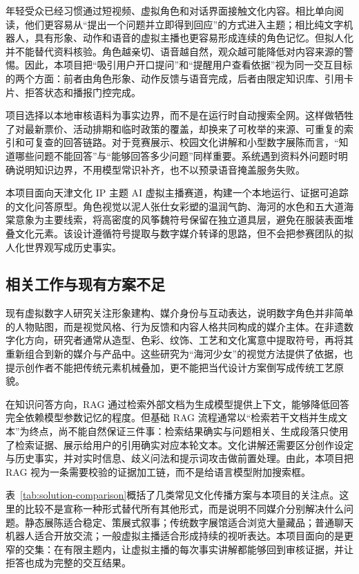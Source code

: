\documentclass[UTF8,zihao=-4,fontset=none,twoside]{ctexart}
\begin{document}
年轻受众已经习惯通过短视频、虚拟角色和对话界面接触文化内容。相比单向阅读，他们更容易从“提出一个问题并立即得到回应”的方式进入主题；相比纯文字机器人，具有形象、动作和语音的虚拟主播也更容易形成连续的角色记忆。但拟人化并不能替代资料核验。角色越亲切、语音越自然，观众越可能降低对内容来源的警惕。因此，本项目把“吸引用户开口提问”和“提醒用户查看依据”视为同一交互目标的两个方面：前者由角色形象、动作反馈与语音完成，后者由限定知识库、引用卡片、拒答状态和播报门控完成。

项目选择以本地审核语料为事实边界，而不是在运行时自动搜索全网。这样做牺牲了对最新票价、活动排期和临时政策的覆盖，却换来了可枚举的来源、可重复的索引和可复查的回答链路。对于竞赛展示、校园文化讲解和小型数字展陈而言，“知道哪些问题不能回答”与“能够回答多少问题”同样重要。系统遇到资料外问题时明确说明知识边界，不用模型常识补齐，也不以预录语音掩盖服务失败。

本项目面向天津文化 IP 主题 AI 虚拟主播赛道，构建一个本地运行、证据可追踪的文化问答原型。角色视觉以泥人张仕女彩塑的温润气韵、海河的水色和五大道海棠意象为主要线索，将高密度的风筝魏符号保留在独立道具层，避免在服装表面堆叠文化元素。该设计遵循符号提取与数字媒介转译的思路\cite{yuan2026symbol,shao2025kite}，但不会把参赛团队的拟人化世界观写成历史事实。

\subsection{相关工作与现有方案不足}

现有虚拟数字人研究关注形象建构、媒介身份与互动表达，说明数字角色并非简单的人物贴图，而是视觉风格、行为反馈和内容人格共同构成的媒介主体\cite{li2025digitalhuman}。在非遗数字化方向，研究者通常从造型、色彩、纹饰、工艺和文化寓意中提取符号，再将其重新组合到新的媒介与产品中\cite{yuan2026symbol,shao2025kite,jiang2024kite}。这些研究为“海河少女”的视觉方法提供了依据，也提示创作者不能把传统元素机械叠加，更不能把当代设计方案倒写成传统工艺原貌。

在知识问答方向，RAG 通过检索外部文档为生成模型提供上下文，能够降低回答完全依赖模型参数记忆的程度\cite{lewis2020rag}。但基础 RAG 流程通常以“检索若干文档并生成文本”为终点，尚不能自然保证三件事：检索结果确实与问题相关、生成段落只使用了检索证据、展示给用户的引用确实对应本轮文本。文化讲解还需要区分创作设定与历史事实，并对实时信息、歧义问法和提示词攻击做前置处理。由此，本项目把 RAG 视为一条需要校验的证据加工链，而不是给语言模型附加搜索框。

表~\ref{tab:solution-comparison}概括了几类常见文化传播方案与本项目的关注点。这里的比较不是宣称一种形式替代所有其他形式，而是说明不同媒介分别解决什么问题。静态展陈适合稳定、策展式叙事；传统数字展馆适合浏览大量藏品；普通聊天机器人适合开放交流；一般虚拟主播适合形成持续的视听表达。本项目面向的是更窄的交集：在有限主题内，让虚拟主播的每次事实讲解都能够回到审核证据，并让拒答也成为完整的交互结果。
\end{document}
